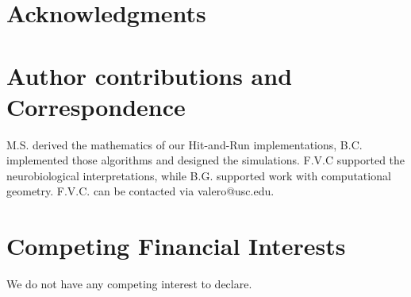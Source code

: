 \documentclass[letterpaper]{article}
\begin{document}
\section*{Acknowledgments}


\section*{Author contributions and Correspondence}
M.S. derived the mathematics of our Hit-and-Run implementations, B.C. implemented those algorithms and designed the simulations. F.V.C supported the neurobiological interpretations, while B.G. supported work with computational geometry. F.V.C. can be contacted via valero@usc.edu.

\section*{Competing Financial Interests}
We do not have any competing interest to declare.



% 
\end{document}
